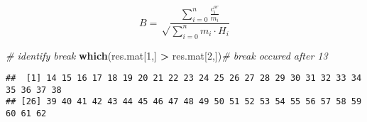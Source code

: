\documentclass[
]{article}
\newenvironment{Shaded}{\begin{snugshade}}{\end{snugshade}}
\newcommand{\CommentTok}[1]{\textcolor[rgb]{0.56,0.35,0.01}{\textit{#1}}}
\newcommand{\DecValTok}[1]{\textcolor[rgb]{0.00,0.00,0.81}{#1}}
\newcommand{\KeywordTok}[1]{\textcolor[rgb]{0.13,0.29,0.53}{\textbf{#1}}}
\newcommand{\NormalTok}[1]{#1}
\newcommand{\OperatorTok}[1]{\textcolor[rgb]{0.81,0.36,0.00}{\textbf{#1}}}
\newcommand{\StringTok}[1]{\textcolor[rgb]{0.31,0.60,0.02}{#1}}
\begin{document}
\begin{Shaded}
\end{Shaded}

\[B=\sqrt \frac {\sum_{i=0}^n \frac {c_i^{or}}{m_i}}{\sum_{i=0}^n m_i \cdot H_i} \]

\begin{Shaded}
\begin{Highlighting}[]
\CommentTok{# identify break}
\KeywordTok{which}\NormalTok{(res.mat[}\DecValTok{1}\NormalTok{,] }\OperatorTok{>}\StringTok{ }\NormalTok{res.mat[}\DecValTok{2}\NormalTok{,])}\CommentTok{# break occured after 13}
\end{Highlighting}
\end{Shaded}

\begin{verbatim}
##  [1] 14 15 16 17 18 19 20 21 22 23 24 25 26 27 28 29 30 31 32 33 34 35 36 37 38
## [26] 39 40 41 42 43 44 45 46 47 48 49 50 51 52 53 54 55 56 57 58 59 60 61 62
\end{verbatim}
\end{document}
